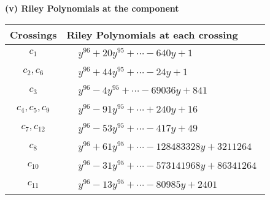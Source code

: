 \documentclass[1p]{elsarticle_modified}
\theoremstyle{definition}
\begin{document}
\newpage\renewcommand{\arraystretch}{1}
\flushleft \textbf{(v) Riley Polynomials at the component}\newline \\
\begin{tabular}{m{50pt}|m{274pt}}
Crossings & \hspace{64pt}Riley Polynomials at each crossing \\
\hline $$\begin{aligned}c_{1}\end{aligned}$$&$\begin{aligned}
&y^{96}+20 y^{95}+\cdots-640 y+1
\end{aligned}$\\
\hline $$\begin{aligned}c_{2},c_{6}\end{aligned}$$&$\begin{aligned}
&y^{96}+44 y^{95}+\cdots-24 y+1
\end{aligned}$\\
\hline $$\begin{aligned}c_{3}\end{aligned}$$&$\begin{aligned}
&y^{96}-4 y^{95}+\cdots-69036 y+841
\end{aligned}$\\
\hline $$\begin{aligned}c_{4},c_{5},c_{9}\end{aligned}$$&$\begin{aligned}
&y^{96}-91 y^{95}+\cdots+240 y+16
\end{aligned}$\\
\hline $$\begin{aligned}c_{7},c_{12}\end{aligned}$$&$\begin{aligned}
&y^{96}-53 y^{95}+\cdots-417 y+49
\end{aligned}$\\
\hline $$\begin{aligned}c_{8}\end{aligned}$$&$\begin{aligned}
&y^{96}+61 y^{95}+\cdots-128483328 y+3211264
\end{aligned}$\\
\hline $$\begin{aligned}c_{10}\end{aligned}$$&$\begin{aligned}
&y^{96}-31 y^{95}+\cdots-573141968 y+86341264
\end{aligned}$\\
\hline $$\begin{aligned}c_{11}\end{aligned}$$&$\begin{aligned}
&y^{96}-13 y^{95}+\cdots-80985 y+2401
\end{aligned}$\\
\hline
\end{tabular}\\~\\
\end{document}
